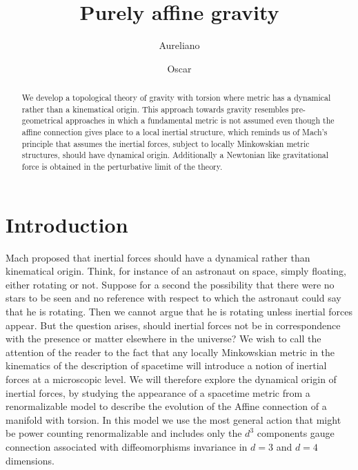\documentclass[twocolumn,
  showpacs,showkeys,prd,superscriptaddress]{revtex4-1}
\begin{document}
\title{Purely affine gravity}


\author{Aureliano }

\author{Oscar }

\begin{abstract}
  We develop a topological theory of gravity with torsion where metric has a dynamical rather than a kinematical origin. This approach towards gravity resembles pre-geometrical approaches in which a fundamental metric is not assumed even though the  affine connection gives place to a local inertial structure, which reminds us of Mach's principle that assumes the inertial forces, subject to locally Minkowskian metric structures, should have dynamical origin. Additionally a Newtonian like gravitational force is obtained in the perturbative limit of the theory.
\end{abstract}


\maketitle

\section{Introduction}

Mach proposed that inertial forces should have a dynamical rather than kinematical origin. Think, for instance of an astronaut on space, simply floating, either rotating or not.   Suppose for a second the possibility that there were no stars to be seen and no reference with respect to which the astronaut could say that he is rotating. Then we cannot argue that he is rotating unless inertial forces appear. But the question arises, should inertial forces not be in correspondence with the presence or matter elsewhere in the universe?  We wish to call the attention of the reader to the fact that any locally Minkowskian metric in the kinematics of the description of spacetime will introduce a notion of inertial forces at a microscopic level. We will therefore explore the dynamical origin of inertial forces, by studying the appearance of a spacetime metric from a renormalizable model to describe the evolution of the Affine connection of a manifold with torsion. In this model we use the most general action that might be power counting renormalizable and includes only the $d^3$ components gauge connection associated with diffeomorphisms invariance in $d=3$ and $d=4$ dimensions.
\end{document}
